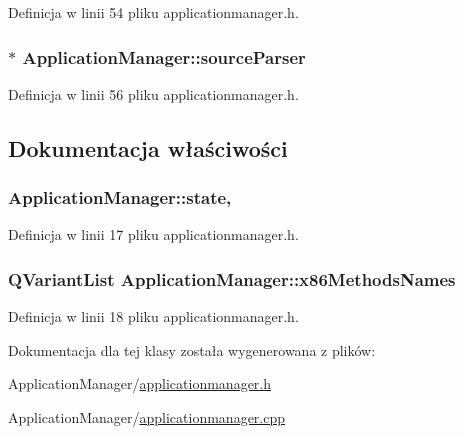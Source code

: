 Definicja w linii 54 pliku applicationmanager.\-h.

\hypertarget{class_application_manager_af1e6bb5f28b480676de7b7f22d465baa}{
\subsubsection[{source\-Parser}]{$\ast$ Application\-Manager\-::source\-Parser\hspace{0.3cm}{\ttfamily [private]}}}\label{class_application_manager_af1e6bb5f28b480676de7b7f22d465baa}


Definicja w linii 56 pliku applicationmanager.\-h.



\subsection{Dokumentacja właściwości}
\hypertarget{class_application_manager_a930a84127f404aa07e142c5b37dfe128}{
\subsubsection[{state}]{ Application\-Manager\-::state\hspace{0.3cm}{\ttfamily [read]}, {\ttfamily [write]}}}\label{class_application_manager_a930a84127f404aa07e142c5b37dfe128}


Definicja w linii 17 pliku applicationmanager.\-h.

\hypertarget{class_application_manager_a04d639af3af2e31840e42bfe72f99a0c}{
\subsubsection[{x86\-Methods\-Names}]{\setlength{\rightskip}{0pt plus 5cm}Q\-Variant\-List Application\-Manager\-::x86\-Methods\-Names\hspace{0.3cm}{\ttfamily [read]}}}\label{class_application_manager_a04d639af3af2e31840e42bfe72f99a0c}


Definicja w linii 18 pliku applicationmanager.\-h.



Dokumentacja dla tej klasy została wygenerowana z plików\-:\begin{DoxyCompactItemize}
\item 
Application\-Manager/\hyperlink{applicationmanager_8h}{applicationmanager.\-h}\item 
Application\-Manager/\hyperlink{applicationmanager_8cpp}{applicationmanager.\-cpp}\end{DoxyCompactItemize}
